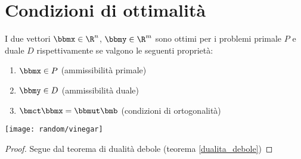 \documentclass[\main/main.tex]{subfiles}
\begin{document}
\section{Condizioni di ottimalità}
\begin{minipage}{\textwidth}
  \begin{minipage}{.83\textwidth}
    \flushleft
    \begin{theorem}
      I due vettori $\bbmx \in \R^n$,  $\bbmy \in \R^m$ sono ottimi per i problemi primale $P$ e duale $D$ rispettivamente se valgono le seguenti proprietà:
      \begin{enumerate}
        \item $\bbmx \in P$ (ammissibilità primale)
        \item $\bbmy \in D$ (ammissibilità duale)
        \item $\bmct \bbmx = \bbmut \bmb$ (condizioni di ortogonalità)
      \end{enumerate}
    \end{theorem}
  \end{minipage}\hfill
  \begin{minipage}{0.15\textwidth}\center
    \texttt{[image: random/vinegar]}
  \end{minipage}
\end{minipage}

\begin{proof}
  Segue dal teorema di dualità debole (teorema \ref{dualita_debole})
\end{proof}
\end{document}

